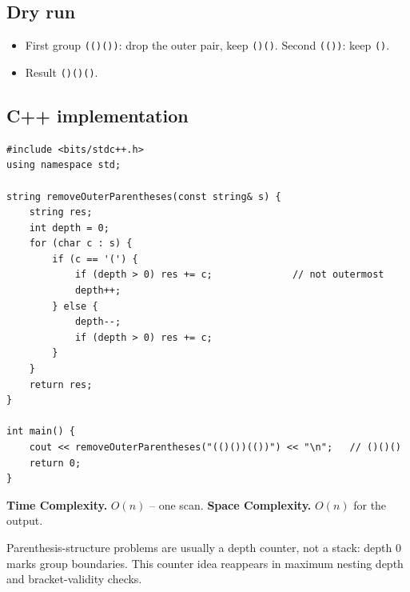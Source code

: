 \subsection*{Dry run}


\begin{itemize}
  \item First group \texttt{(()())}: drop the outer pair, keep
        \texttt{()()}. Second \texttt{(())}: keep \texttt{()}.
  \item Result \texttt{()()()}.
\end{itemize}

\subsection*{C++ implementation}

\begin{lstlisting}
#include <bits/stdc++.h>
using namespace std;

string removeOuterParentheses(const string& s) {
    string res;
    int depth = 0;
    for (char c : s) {
        if (c == '(') {
            if (depth > 0) res += c;              // not outermost
            depth++;
        } else {
            depth--;
            if (depth > 0) res += c;
        }
    }
    return res;
}

int main() {
    cout << removeOuterParentheses("(()())(())") << "\n";   // ()()()
    return 0;
}
\end{lstlisting}

\begin{complexitybox}
\textbf{Time Complexity.} $O(n)$ -- one scan. \textbf{Space Complexity.}
$O(n)$ for the output.
\end{complexitybox}

\begin{takeawaybox}
Parenthesis-structure problems are usually a depth counter, not a stack:
depth $0$ marks group boundaries. This counter idea reappears in maximum
nesting depth and bracket-validity checks.
\end{takeawaybox}

